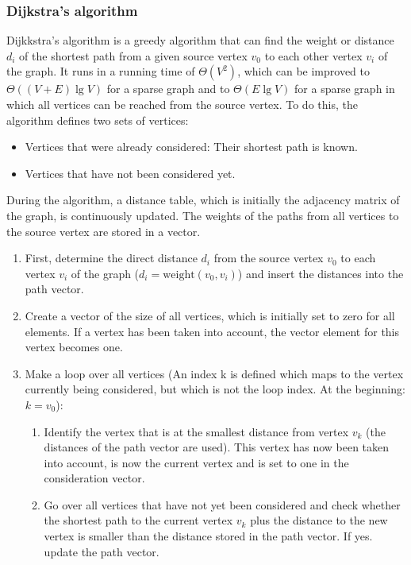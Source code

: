 \subsubsection{Dijkstra's algorithm}

Dijkkstra's algorithm is a greedy algorithm that can find the weight or distance $d_i$ of the shortest path from a given source vertex 
$v_0$ to each other vertex $v_i$ of the graph. It runs in a running time of $\Theta(V^2)$, which can be improved to $\Theta((V+E)\lg V)$ for a sparse graph and to $\Theta(E\lg V)$ for a sparse graph in which all vertices can be reached from the source vertex. To do this, the algorithm defines two sets of vertices:

\begin{itemize}
    \item Vertices that were already considered: Their shortest path is known.
    \item Vertices that have not been considered yet. 
\end{itemize}

During the algorithm, a distance table, which is initially the adjacency matrix of the graph, is continuously updated. The weights of the paths from all vertices to the source vertex are stored in a vector.

\begin{enumerate}
    \item First, determine the direct distance $d_i$ from the source vertex $v_0$ to each vertex $v_i$ of the graph ($d_i=\mathrm{weight}(v_0,v_i)$) and insert the distances into the path vector.
    \item Create a vector of the size of all vertices, which is initially set to zero for all elements. If a vertex has been taken into account, the vector element for this vertex becomes one. 
    \item Make a loop over all vertices (An index k is defined which maps to the vertex currently being considered, but which is not the loop index. At the beginning: $k=v_0$):
    \begin{enumerate}
        \item Identify the vertex that is at the smallest distance from vertex $v_k$ (the distances of the path vector are used). This vertex has now been taken into account, is now the current vertex and is set to one in the consideration vector.
        \item Go over all vertices that have not yet been considered and check whether the shortest path to the current vertex $v_k$ plus the distance to the new vertex is smaller than the distance stored in the path vector. If yes. update the path vector.
    \end{enumerate}
\end{enumerate}

